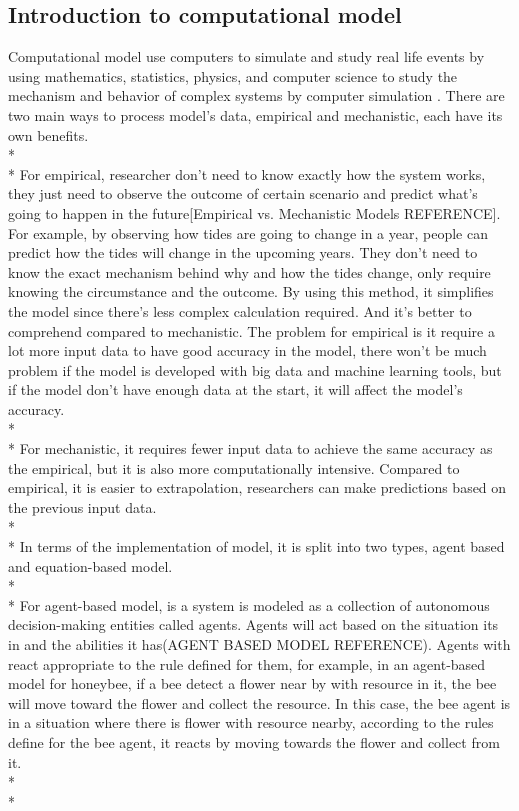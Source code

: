\subsection{Introduction to computational model}
Computational model use computers to simulate and study real life events by using mathematics, statistics, physics, and computer science to study the mechanism and behavior of complex systems by computer simulation \cite{Reference1}. There are two main ways to process model’s data, empirical and mechanistic, each have its own benefits. \\*\\*
For empirical, researcher don’t need to know exactly how the system works, they just need to observe the outcome of certain scenario and predict what’s going to happen in the future[Empirical vs. Mechanistic Models REFERENCE]. For example, by observing how tides are going to change in a year, people can predict how the tides will change in the upcoming years. They don’t need to know the exact mechanism behind why and how the tides change, only require knowing the circumstance and the outcome. By using this method, it simplifies the model since there’s less complex calculation required. And it’s better to comprehend compared to mechanistic. The problem for empirical is it require a lot more input data to have good accuracy in the model, there won’t be much problem if the model is developed with big data and machine learning tools, but if the model don’t have enough data at the start, it will affect the model’s accuracy. \\*\\*
For mechanistic, it requires fewer input data to achieve the same accuracy as the empirical, but it is also more computationally intensive. Compared to empirical, it is easier to extrapolation, researchers can make predictions based on the previous input data. \\*\\*
In terms of the implementation of model, it is split into two types, agent based and equation-based model. \\*\\* 
For agent-based model, is a system is modeled as a collection of autonomous decision-making entities called agents. Agents will act based on the situation its in and the abilities it has(AGENT BASED MODEL REFERENCE). Agents with react appropriate to the rule defined for them, for example, in an agent-based model for honeybee, if a bee detect a flower near by with resource in it, the bee will move toward the flower and collect the resource. In this case, the bee agent is in a situation where there is flower with resource nearby, according to the rules define for the bee agent, it reacts by moving towards the flower and collect from it. \\*\\*
